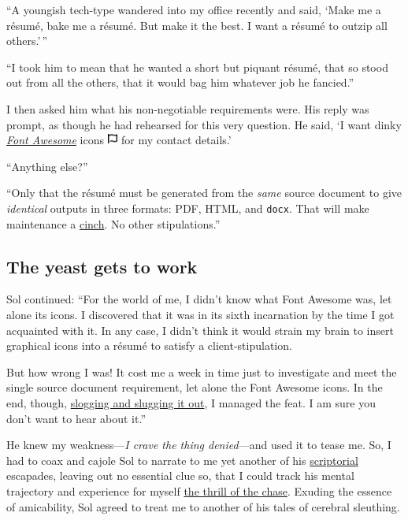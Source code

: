 \documentclass[
  british,
  a4paper,
  rgb,
  dvipsnames,
  svgnames,
  hyphens]{article}
\begin{document}
``A youngish tech-type wandered into my office recently and said, `Make
me a résumé, bake me a résumé. But make it the best. I want a résumé to
outzip all others.'\,''

``I took him to mean that he wanted a short but piquant résumé, that so
stood out from all the others, that it would bag him whatever job he
fancied.''

I then asked him what his non-negotiable requirements were. His reply
was prompt, as though he had rehearsed for this very question. He said,
`I want dinky \href{https://fontawesome.com/}{\emph{Font Awesome}} icons
\includegraphics[width=0.025\textwidth,height=\textheight]{images/font-awesome.svg}
for my contact details.'

``Anything else?''

``Only that the résumé must be generated from the \emph{same} source
document to give \emph{identical} outputs in three formats: PDF, HTML,
and \texttt{docx}. That will make maintenance a
\href{https://www.merriam-webster.com/dictionary/cinch}{cinch}. No other
stipulations.''

\hypertarget{the-yeast-gets-to-work}{%
\subsection{The yeast gets to work}\label{the-yeast-gets-to-work}}

Sol continued: ``For the world of me, I didn't know what Font Awesome
was, let alone its icons. I discovered that it was in its sixth
incarnation by the time I got acquainted with it. In any case, I didn't
think it would strain my brain to insert graphical icons into a résumé
to satisfy a client-stipulation.

But how wrong I was! It cost me a week in time just to investigate and
meet the single source document requirement, let alone the Font Awesome
icons. In the end, though,
\href{https://idioms.thefreedictionary.com/slog\%2Fslug+it+outslogging}{slogging
and slugging it out}, I managed the feat. I am sure you don't want to
hear about it.''

He knew my weakness---\emph{I crave the thing denied}---and used it to
tease me. So, I had to coax and cajole Sol to narrate to me yet another
of his \href{https://www.lexico.com/definition/scriptorial}{scriptorial}
escapades, leaving out no essential clue so, that I could track his
mental trajectory and experience for myself
\href{https://www.collinsdictionary.com/dictionary/english/the-thrill-of-the-chase}{the
thrill of the chase}. Exuding the essence of amicability, Sol agreed to
treat me to another of his tales of cerebral sleuthing.
\end{document}
